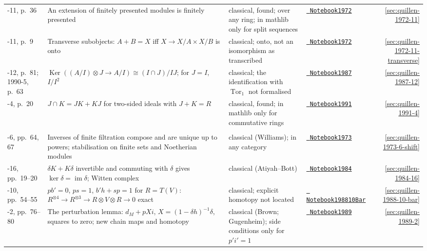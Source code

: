 \documentclass[11pt]{article}
\newcommand{\leanblobmain}{https://github.com/Commutator-IO/grothendieck-project/blob/main/lean/Quillen}
\theoremstyle{plain}
\theoremstyle{definition}
\theoremstyle{remark}
\renewcommand{\_}{\bkunderscore\allowbreak}
\let\origtexttt\texttt
\renewcommand{\texttt}[1]{\origtexttt{\XeTeXinterchartokenstate=1 #1}}
\begin{document}
\begin{center}
{\begin{longtable}{@{}>{\raggedright\arraybackslash}p{1.6cm}>{\raggedright\arraybackslash}p{5.6cm}>{\raggedright\arraybackslash}p{3.9cm}>{\raggedright\arraybackslash}p{2.6cm}r@{}}
1972-11, p.~36 & An extension of finitely presented modules is finitely presented & classical, found; over any ring; in mathlib only for split sequences & \href{\leanblobmain/Notebook1972_11.lean}{\texttt{Notebook1972\_11}} & \ref{sec:quillen-1972-11}\\
1972-11, p.~9 & Transverse subobjects: $A + B = X$ iff $X \to X/A \times X/B$ is onto & classical; onto, not an isomorphism as transcribed & \href{\leanblobmain/Notebook1972_11.lean}{\texttt{Notebook1972\_11}} & \ref{sec:quillen-1972-11-transverse}\\
1987-12, p.~81; 1990-5, p.~63 & $\operatorname{Ker}((A/I)\otimes J \to A/I) \cong (I \cap J)/IJ$; for $J = I$, $I/I^2$ & classical; the identification with $\operatorname{Tor}_1$ not formalised & \href{\leanblobmain/Notebook1987_12.lean}{\texttt{Notebook1987\_12}} & \ref{sec:quillen-1987-12}\\
1991-4, p.~20 & $J \cap K = JK + KJ$ for two-sided ideals with $J + K = R$ & classical, found; in mathlib only for commutative rings & \href{\leanblobmain/Notebook1991_4.lean}{\texttt{Notebook1991\_4}} & \ref{sec:quillen-1991-4}\\
\addlinespace\multicolumn{5}{@{}l@{}}{\textbf{Homological algebra and complexes}}\\*
1973-6, pp.~64, 67 & Inverses of finite filtration compose and are unique up to powers; stabilisation on finite sets and Noetherian modules & classical (Williams); in any category & \href{\leanblobmain/Notebook1973_6.lean}{\texttt{Notebook1973\_6}} & \ref{sec:quillen-1973-6-shift}\\
1984-16, pp.~19--20 & $\delta K + K\delta$ invertible and commuting with $\delta$ gives $\ker\delta = \operatorname{im}\delta$; Witten complex & classical (Atiyah--Bott) & \href{\leanblobmain/Notebook1984_16.lean}{\texttt{Notebook1984\_16}} & \ref{sec:quillen-1984-16}\\
1988-10, pp.~54--55 & $pb' = 0$, $ps = 1$, $b'h + sp = 1$ for $R = T(V)$: $R^{\otimes 4} \to R^{\otimes 3} \to R \otimes V \otimes R \to 0$ exact & classical; explicit homotopy not located & \href{\leanblobmain/Notebook1988_10Bar.lean}{\texttt{Notebook1988\_10Bar}} & \ref{sec:quillen-1988-10-bar}\\
1989-2, pp.~76--80 & The perturbation lemma: $d_M + pXi$, $X = (1 - \delta h)^{-1}\delta$, squares to zero; new chain maps and homotopy & classical (Brown; Gugenheim); side conditions only for $p'i' = 1$ & \href{\leanblobmain/Notebook1989_2.lean}{\texttt{Notebook1989\_2}} & \ref{sec:quillen-1989-2}\\

\end{longtable}}
\end{center}
\end{document}
